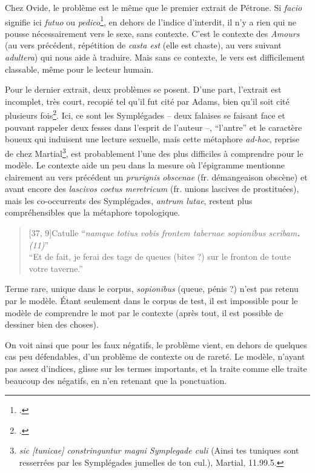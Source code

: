 Chez Ovide, le problème est le même que le premier extrait de Pétrone. Si \textit{facio} signifie ici \textit{futuo} ou \textit{pedico}\footcite[p.204]{adams}, en dehors de l'indice d'interdit, il n'y a rien qui ne pousse nécessairement vers le sexe, sans contexte. C'est le contexte des \textit{Amours} (au vers précédent, répétition de \textit{casta est} (elle est chaste), au vers suivant \textit{adultera}) qui nous aide à traduire. Mais sans ce contexte, le vers est difficilement classable, même pour le lecteur humain.

Pour le dernier extrait, deux problèmes se posent. D'une part, l'extrait est incomplet, très court, recopié tel qu'il fut cité par Adams, bien qu'il soit cité plusieurs fois\footcite[pp.114, 172 et 240]{adams}. Ici, ce sont les Symplégades -- deux falaises se faisant face et pouvant rappeler deux fesses dans l'esprit de l'auteur --, \enquote{l'antre} et le caractère boueux qui induisent une lecture sexuelle, mais cette métaphore \textit{ad-hoc}, reprise de chez Martial\footnote{\textit{sic {[tunicae]} constringuntur magni Symplegade culi} (Ainsi tes tuniques sont resserrées par les Symplégades jumelles de ton cul.), Martial, 11.99.5.}, est probablement l'une des plus difficiles à comprendre pour le modèle. Le contexte aide un peu dans la mesure où l'épigramme mentionne clairement au vers précédent un \textit{prurignis obscenae} (fr. démangeaison obscène) et avant encore des \textit{lascivos coetus meretricum} (fr. unions lascives de prostituées), mais les co-occurrents des Symplégades, \textit{antrum lutae}, restent plus compréhensibles que la métaphore topologique.

\starbreak

\begin{quote}[37, 9]{Catulle}
    \enquote{\textit{namque totius vobis frontem tabernae sopionibus scribam\textbf{.} (11)}} \\
    \enquote{Et de fait, je ferai des tags de queues (bites ?) sur le fronton de toute votre taverne.}
\end{quote}

Terme rare, unique dans le corpus, \textit{sopionibus} (queue, pénis ?) n'est pas retenu par le modèle. Étant seulement dans le corpus de test, il est impossible pour le modèle de comprendre le mot par le contexte (après tout, il est possible de dessiner bien des choses).

On voit ainsi que pour les faux négatifs, le problème vient, en dehors de quelques cas peu défendables, d'un problème de contexte ou de rareté. Le modèle, n'ayant pas assez d'indices, glisse sur les termes importants, et la traite comme elle traite beaucoup des négatifs, en n'en retenant que la ponctuation.

